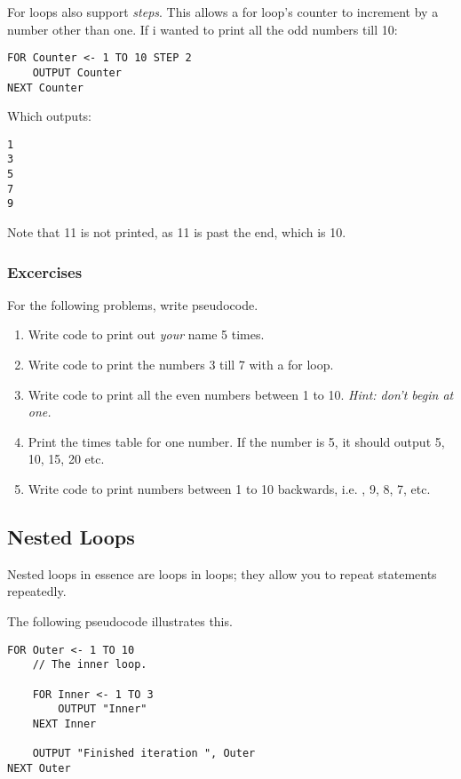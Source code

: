 \documentclass[./main.tex]{subfiles}
\begin{document}
For loops also support \emph{steps}. This allows a for loop's counter to increment by a number other than one. If i wanted to print all the odd numbers till 10:

\begin{verbatim}
FOR Counter <- 1 TO 10 STEP 2
    OUTPUT Counter
NEXT Counter
\end{verbatim}

Which outputs:

\begin{verbatim}
1
3
5
7
9
\end{verbatim}

Note that 11 is not printed, as 11 is past the end, which is 10.

\subsubsection{Excercises}
\label{sec:for_loop_exercises}

For the following problems, write pseudocode.

\begin{enumerate}
    \item Write code to print out \emph{your} name 5 times.
        \mediumlines

    \item Write code to print the numbers 3 till 7 with a for loop.
        \mediumlines

    \item Write code to print all the even numbers between 1 to 10. \emph{Hint: don't begin at one.}
        \mediumlines

    \item Print the times table for one number. If the number is 5, it should output 5, 10, 15, 20 etc.
        \mediumlines

    \item Write code to print numbers between 1 to 10 backwards, i.e. {, 9, 8, 7, } etc.
        \mediumlines
\end{enumerate}

\subsection{Nested Loops}

Nested loops in essence are loops in loops; they allow you to repeat statements repeatedly.

The following pseudocode illustrates this.

\begin{verbatim}
FOR Outer <- 1 TO 10
    // The inner loop.

    FOR Inner <- 1 TO 3
        OUTPUT "Inner"
    NEXT Inner

    OUTPUT "Finished iteration ", Outer
NEXT Outer
\end{verbatim}
\end{document}
